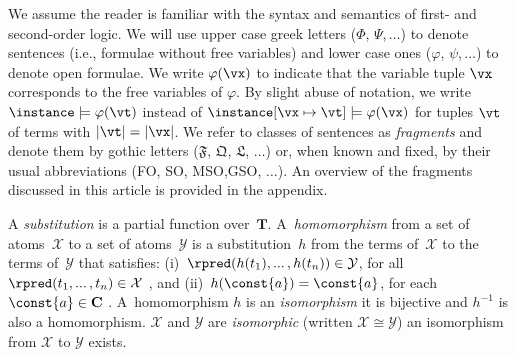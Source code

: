  We assume the reader is familiar with the syntax and semantics of first- and second-order logic. We will use upper case greek letters ($\Phi$, $\Psi$,$\,\ldots$) to denote sentences (i.e., formulae without free variables) and lower case ones ($\varphi$, $\psi$,$\,\ldots$) to denote open formulae. We write $\varphi(\vx)$ to indicate that the variable tuple $\vx$ corresponds to the free variables of $\varphi$. By slight abuse of notation, we write $\instance \models \varphi(\vt)$ instead of $\instance [\vx \mapsto \vt] \models \varphi(\vx)$ for tuples $\vt$ of terms with $|\vt|=|\vx|$. We refer to classes of sentences as \emph{fragments} and denote them by gothic letters ($\mathfrak{F}$, $\mathfrak{Q}$, $\mathfrak{L}$, $\ldots$) or, when known and fixed, by their usual abbreviations (FO, SO, MSO,\linebreak GSO, $\ldots$). An overview of the fragments discussed in this article is provided in the appendix. %


\renewcommand{\smallldots}{...\,}
\medskip {} A \emph{substitution} is a partial function over~$\mathbf{T}$.
A~\emph{homomorphism} from a set of atoms~$\mathcal{X}$ to a set of 
atoms~$\mathcal{Y}$ is a substitution~$h$ from the terms of~$\mathcal{X}$ to the terms of~$\mathcal{Y}$ that satisfies:
(i)~$\rpred(h(t_1), \smallldots, h(t_n)) \in \mathcal{Y}$, for all~$\rpred(t_1, \smallldots, t_n) \in \mathcal{X}$%
, 
and 
(ii)~$h(\const{a}) = \const{a}$, for each~$\const{a} \in \mathbf{C}$%
. 
A~homomorphism $h$ is an \emph{isomorphism} \iffi it is bijective and $h^{-1}$ is also a homomorphism. $\mathcal{X}$ and $\mathcal{Y}$ are \emph{isomorphic} (written $\mathcal{X} \cong \mathcal{Y}$) \iffi an isomorphism from $\mathcal{X}$ to $\mathcal{Y}$ exists.

\renewcommand{\smallldots}{\ldots}


